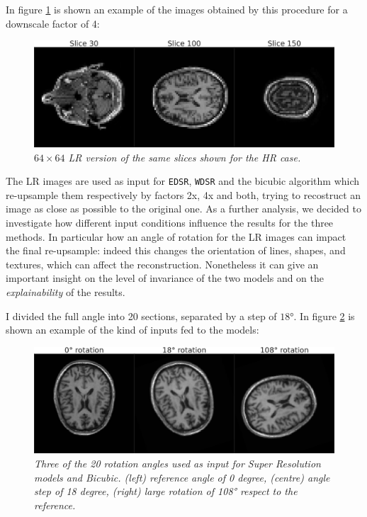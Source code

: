 \documentclass[12pt,a4paper]{report}
\begin{document}
In figure \ref{fig:inp4} is shown an example of the images obtained by this procedure for a downscale factor of 4:

\begin{figure}[H]
 \centering
 \includegraphics[scale=0.3]{images/inp4_slice_comp.png}
 \caption{\it $64 \times 64$ LR version of the same slices shown for the HR case.}
 \label{fig:inp4}
\end{figure}

The LR images are used as input for {\tt EDSR}, {\tt WDSR} and the bicubic algorithm which re-upsample them respectively by factors 2x, 4x and both, trying to recostruct an image as close as possible to the original one.
As a further analysis, we decided to investigate how different input conditions influence the results for the three methods. 
In particular how an angle of rotation for the LR images can impact the final re-upsample: indeed this changes the orientation of lines, shapes, and textures, which can affect the reconstruction.
Nonetheless it can give an important insight on the level of invariance of the two models and on the {\it explainability} of the results. 

I divided the full angle into 20 sections, separated by a step of $18$°. In figure \ref{fig:rotations} is shown an example of the kind of inputs fed to the models:

\begin{figure}[H]
 \centering
 \includegraphics[scale=0.3]{images/rotations.png}
 \caption{\it Three of the 20 rotation angles used as input for Super Resolution models and Bicubic. (left) reference angle of 0 degree, (centre) angle step of 18 degree, (right) large rotation of 108° respect to the reference. }
 \label{fig:rotations}
\end{figure}
\end{document}

